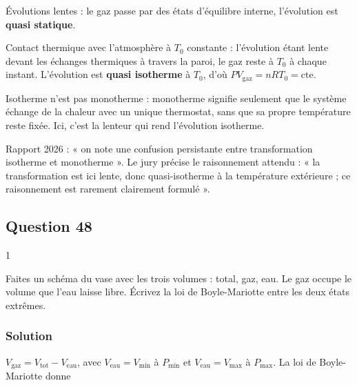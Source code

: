 \documentclass[11pt,a4paper]{article}
\begin{document}
Évolutions lentes : le gaz passe par des états d'équilibre interne, l'évolution est \textbf{quasi statique}.

Contact thermique avec l'atmosphère à \(T_0\) constante : l'évolution étant lente devant les échanges thermiques à travers la paroi, le gaz reste à \(T_0\) à chaque instant. L'évolution est \textbf{quasi isotherme} à \(T_0\), d'où \(PV_{\text{gaz}}=nRT_0=\text{cte}\).

\begin{piege}

Isotherme n'est pas monotherme : monotherme signifie seulement que le système échange de la chaleur avec un unique thermostat, sans que sa propre température reste fixée. Ici, c'est la lenteur qui rend l'évolution isotherme.

\end{piege}

\begin{jury}

Rapport 2026 : « on note une confusion persistante entre transformation isotherme et monotherme ». Le jury précise le raisonnement attendu : « la transformation est ici lente, donc quasi-isotherme à la température extérieure ; ce raisonnement est rarement clairement formulé ».

\end{jury}

\hypertarget{question-48}{%
\subsection{Question 48}\label{question-48}}

\begin{indication}{1}

Faites un schéma du vase avec les trois volumes : total, gaz, eau. Le gaz occupe le volume que l'eau laisse libre. Écrivez la loi de Boyle-Mariotte entre les deux états extrêmes.

\end{indication}

\hypertarget{solution-47}{%
\subsubsection{Solution}\label{solution-47}}

\(V_{\text{gaz}}=V_{\text{tot}}-V_{\text{eau}}\), avec \(V_{\text{eau}}=V_{\min}\) à \(P_{\min}\) et \(V_{\text{eau}}=V_{\max}\) à \(P_{\max}\). La loi de Boyle-Mariotte donne
\end{document}
